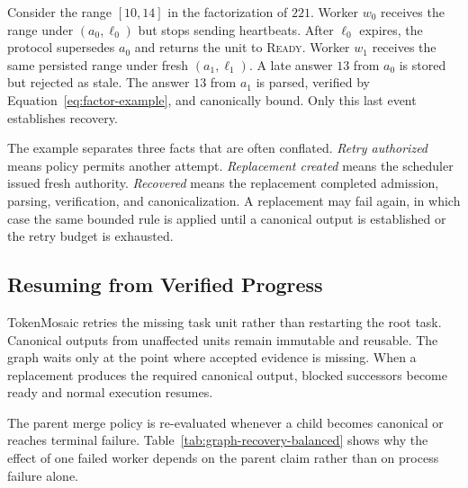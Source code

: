 \documentclass{article}
\theoremstyle{plain}
\begin{document}
Consider the range $[10,14]$ in the factorization of $221$. Worker $w_0$ receives the range under $(a_0,\ell_0)$ but stops sending heartbeats. After $\ell_0$ expires, the protocol supersedes $a_0$ and returns the unit to \textsc{Ready}. Worker $w_1$ receives the same persisted range under fresh $(a_1,\ell_1)$. A late answer $13$ from $a_0$ is stored but rejected as stale. The answer $13$ from $a_1$ is parsed, verified by Equation~\ref{eq:factor-example}, and canonically bound. Only this last event establishes recovery.

The example separates three facts that are often conflated. \emph{Retry authorized} means policy permits another attempt. \emph{Replacement created} means the scheduler issued fresh authority. \emph{Recovered} means the replacement completed admission, parsing, verification, and canonicalization. A replacement may fail again, in which case the same bounded rule is applied until a canonical output is established or the retry budget is exhausted.

\subsection{Resuming from Verified Progress}
\label{subsec:graph-level-recovery}

TokenMosaic retries the missing task unit rather than restarting the root task. Canonical outputs from unaffected units remain immutable and reusable. The graph waits only at the point where accepted evidence is missing. When a replacement produces the required canonical output, blocked successors become ready and normal execution resumes.

The parent merge policy is re-evaluated whenever a child becomes canonical or reaches terminal failure. Table~\ref{tab:graph-recovery-balanced} shows why the effect of one failed worker depends on the parent claim rather than on process failure alone.
\end{document}
